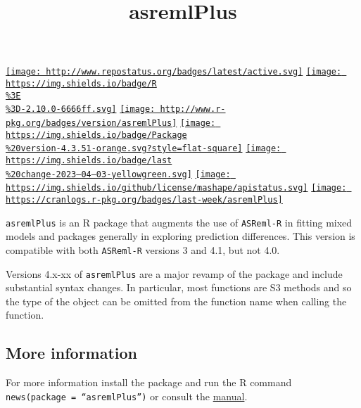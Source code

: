 \documentclass[
]{article}
\title{asremlPlus}
\author{}
\date{\vspace{-2.5em}}
\begin{document}
\maketitle

\href{http://www.repostatus.org/\#active}{\texttt{[image: http://www.repostatus.org/badges/latest/active.svg]}}
\href{https://cran.r-project.org/}{\texttt{[image: https://img.shields.io/badge/R\\\%3E\\\%3D-2.10.0-6666ff.svg]}}
\href{https://cran.r-project.org/package=asremlPlus}{\texttt{[image: http://www.r-pkg.org/badges/version/asremlPlus]}}
\href{/commits/master}{\texttt{[image: https://img.shields.io/badge/Package\\\%20version-4.3.51-orange.svg?style=flat-square]}}
\href{/commits/master}{\texttt{[image: https://img.shields.io/badge/last\\\%20change-2023--04--03-yellowgreen.svg]}}
\href{http://choosealicense.com/licenses/mit/}{\texttt{[image: https://img.shields.io/github/license/mashape/apistatus.svg]}}
\href{commits/master}{\texttt{[image: https://cranlogs.r-pkg.org/badges/last-week/asremlPlus]}}

\texttt{asremlPlus} is an R package that augments the use of
\texttt{ASReml-R} in fitting mixed models and packages generally in
exploring prediction differences. This version is compatible with both
\texttt{ASReml-R} versions 3 and 4.1, but not 4.0.

Versions 4.x-xx of \texttt{asremlPlus} are a major revamp of the package
and include substantial syntax changes. In particular, most functions
are S3 methods and so the type of the object can be omitted from the
function name when calling the function.

\hypertarget{more-information}{%
\subsection{More information}\label{more-information}}

For more information install the package and run the R command
\texttt{news(package\ =\ “asremlPlus”)} or consult the
\href{./vignettes/asremlPlus-manual.pdf}{manual}.
\end{document}
